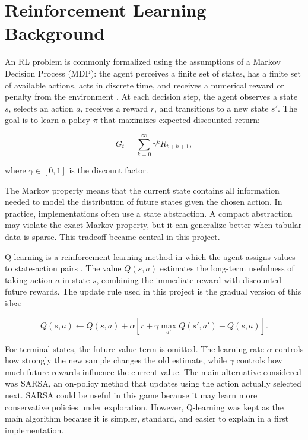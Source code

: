 \documentclass[conference]{IEEEtran}
\begin{document}
\section{Reinforcement Learning Background}

An RL problem is commonly formalized using the assumptions of a Markov Decision
Process (MDP): the agent perceives a finite set of states, has a finite set of
available actions, acts in discrete time, and receives a numerical reward or
penalty from the environment \cite{sanchoQLearning}. At each decision step, the
agent observes a state $s$, selects an action $a$, receives a reward $r$, and
transitions to a new state $s'$. The goal is to learn a policy $\pi$ that maximizes
expected discounted return:

\begin{equation}
G_t = \sum_{k=0}^{\infty} \gamma^k R_{t+k+1},
\end{equation}

where $\gamma \in [0,1]$ is the discount factor.

The Markov property means that the current state contains all information needed
to model the distribution of future states given the chosen action. In practice,
implementations often use a state abstraction. A compact abstraction may violate
the exact Markov property, but it can generalize better when tabular data is
sparse. This tradeoff became central in this project.

Q-learning is a reinforcement learning method in which the agent assigns values to
state-action pairs \cite{sanchoQLearning}. The value $Q(s,a)$ estimates the
long-term usefulness of taking action $a$ in state $s$, combining the immediate
reward with discounted future rewards. The update rule used in this project is the
gradual version of this idea:

\begin{equation}
Q(s,a) \leftarrow Q(s,a) +
\alpha \left[r + \gamma \max_{a'} Q(s',a') - Q(s,a)\right].
\label{eq:qlearning}
\end{equation}

For terminal states, the future value term is omitted. The learning rate $\alpha$
controls how strongly the new sample changes the old estimate, while $\gamma$
controls how much future rewards influence the current value. The main alternative
considered was SARSA, an on-policy method that updates using the action actually
selected next. SARSA could be useful in this game because it may learn more
conservative policies under exploration. However, Q-learning was kept as the main
algorithm because it is simpler, standard, and easier to explain in a first
implementation.
\end{document}
